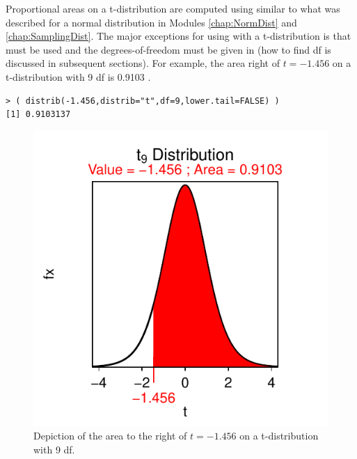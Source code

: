\documentclass[10pt,openany]{book}\usepackage[]{graphicx}\usepackage[]{color}
\makeatletter
\newenvironment{kframe}{%
 \def\at@end@of@kframe{}%
 \ifinner\ifhmode%
  \def\at@end@of@kframe{\end{minipage}}%
  \begin{minipage}{\columnwidth}%
 \fi\fi%
 \def\FrameCommand##1{\hskip\@totalleftmargin \hskip-\fboxsep
 \colorbox{shadecolor}{##1}\hskip-\fboxsep
     \hskip-\linewidth \hskip-\@totalleftmargin \hskip\columnwidth}%
 \MakeFramed {\advance\hsize-\width
   \@totalleftmargin\z@ \linewidth\hsize
   \@setminipage}}%
 {\par\unskip\endMakeFramed%
 \at@end@of@kframe}
\newenvironment{knitrout}{}{} %
\makeatother
\begin{document}
\newpage
\vspace*{12pt}
Proportional areas on a t-distribution are computed using  similar to what was described for a normal distribution in Modules \ref{chap:NormDist} and \ref{chap:SamplingDist}. The major exceptions for using  with a t-distribution is that  must be used and the degrees-of-freedom must be given in  (how to find df is discussed in subsequent sections). For example, the area right of $t=-1.456$ on a t-distribution with 9 df is 0.9103 .
\begin{knitrout}
\color{fgcolor}\begin{kframe}
\begin{verbatim}
> ( distrib(-1.456,distrib="t",df=9,lower.tail=FALSE) )
[1] 0.9103137
\end{verbatim}
\end{kframe}\begin{figure}[hbtp]

{\centering \includegraphics[width=.4\linewidth]{Figs/tarea1-1} 

}

\caption[Depiction of the area to the right of $t=-1.456$ on a t-distribution with 9 df]{Depiction of the area to the right of $t=-1.456$ on a t-distribution with 9 df.}\label{fig:tarea1}
\end{figure}


\end{knitrout}
\end{document}
